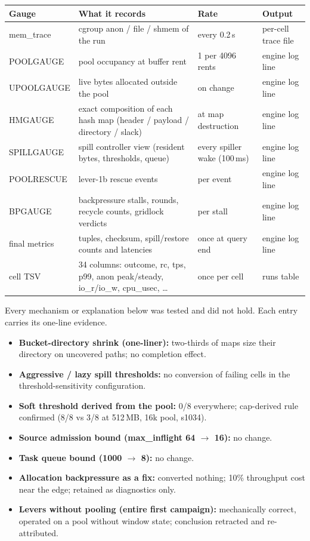 
\begin{longtable}{|p{3.1cm}|p{4.6cm}|p{2.3cm}|p{2.7cm}|}
\hline
\textbf{Gauge} & \textbf{What it records} & \textbf{Rate} & \textbf{Output} \\
\hline
mem\_trace & cgroup anon / file / shmem of the run & every 0.2\,s & per-cell trace file \\
\hline
POOLGAUGE & pool occupancy at buffer rent & 1 per 4096 rents & engine log line \\
\hline
UPOOLGAUGE & live bytes allocated outside the pool & on change & engine log line \\
\hline
HMGAUGE & exact composition of each hash map (header / payload / directory / slack) & at map destruction & engine log line \\
\hline
SPILLGAUGE & spill controller view (resident bytes, thresholds, queue) & every spiller wake (100\,ms) & engine log line \\
\hline
POOLRESCUE & lever-1b rescue events & per event & engine log line \\
\hline
BPGAUGE & backpressure stalls, rounds, recycle counts, gridlock verdicts & per stall & engine log line \\
\hline
final metrics & tuples, checksum, spill/restore counts and latencies & once at query end & engine log line \\
\hline
cell \ac{TSV} & 34 columns: outcome, rc, tps, p99, anon peak/steady, io\_r/io\_w, cpu\_usec, \ldots & once per cell & runs table \\
\hline
\end{longtable}


Every mechanism or explanation below was tested and did not hold.
Each entry carries its one-line evidence.

\begin{itemize}
  \item \textbf{Bucket-directory shrink (one-liner):} two-thirds of maps size their directory on uncovered paths; no completion effect.
  \item \textbf{Aggressive / lazy spill thresholds:} no conversion of failing cells in the threshold-sensitivity configuration.
  \item \textbf{Soft threshold derived from the pool:} 0/8 everywhere; cap-derived rule confirmed (8/8 vs 3/8 at 512\,MB, 16k pool, s1034).
  \item \textbf{Source admission bound (max\_inflight 64 $\to$ 16):} no change.
  \item \textbf{Task queue bound (1000 $\to$ 8):} no change.
  \item \textbf{Allocation backpressure as a fix:} converted nothing; 10\% throughput cost near the edge; retained as diagnostics only.
  \item \textbf{Levers without pooling (entire first campaign):} mechanically correct, operated on a pool without window state; conclusion retracted and re-attributed.
\end{itemize}

